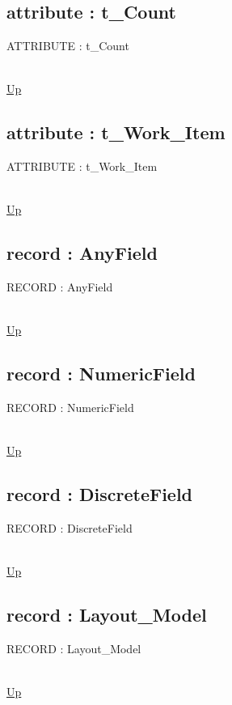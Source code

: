 \subsection*{attribute : t\_Count}
\hypertarget{ecldoc:ml_core.types.t_count}{ATTRIBUTE : t\_Count} \\
\hyperlink{ecldoc:ML_Core.Types}{Up} \\
\par
\subsection*{attribute : t\_Work\_Item}
\hypertarget{ecldoc:ml_core.types.t_work_item}{ATTRIBUTE : t\_Work\_Item} \\
\hyperlink{ecldoc:ML_Core.Types}{Up} \\
\par
\subsection*{record : AnyField}
\hypertarget{ecldoc:ml_core.types.anyfield}{RECORD : AnyField} \\
\hyperlink{ecldoc:ML_Core.Types}{Up} \\
\par
\subsection*{record : NumericField}
\hypertarget{ecldoc:ml_core.types.numericfield}{RECORD : NumericField} \\
\hyperlink{ecldoc:ML_Core.Types}{Up} \\
\par
\subsection*{record : DiscreteField}
\hypertarget{ecldoc:ml_core.types.discretefield}{RECORD : DiscreteField} \\
\hyperlink{ecldoc:ML_Core.Types}{Up} \\
\par
\subsection*{record : Layout\_Model}
\hypertarget{ecldoc:ml_core.types.layout_model}{RECORD : Layout\_Model} \\
\hyperlink{ecldoc:ML_Core.Types}{Up} \\
\par
